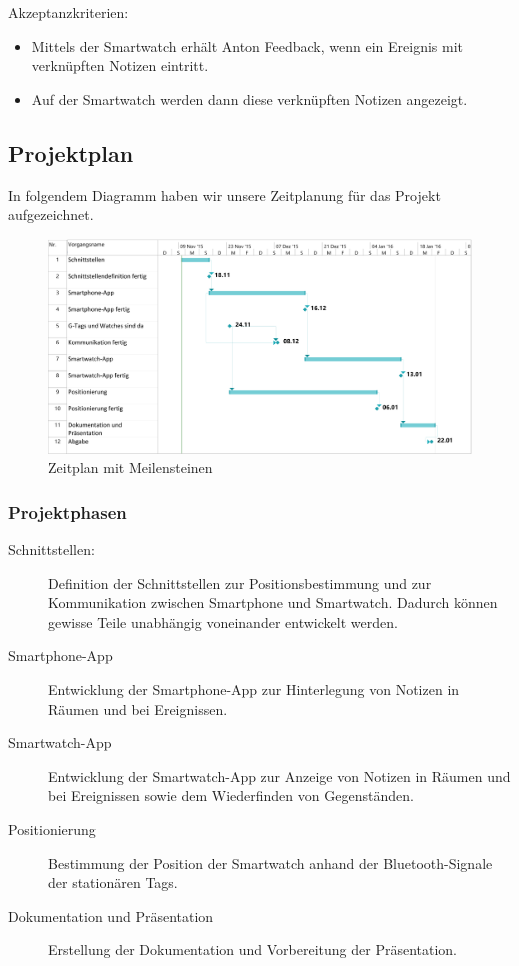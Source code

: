 Akzeptanzkriterien:
\begin{itemize}
\item Mittels der Smartwatch erhält Anton Feedback, wenn ein Ereignis mit verknüpften Notizen eintritt.
\item Auf der Smartwatch werden dann diese verknüpften Notizen angezeigt.
\end{itemize}


\subsection{Projektplan}

In folgendem Diagramm haben wir unsere Zeitplanung für das Projekt aufgezeichnet.

\begin{figure}[tbh]
\centering
\includegraphics[width=1.0\linewidth]{Bilder/Projektplan}
\caption{Zeitplan mit Meilensteinen}
\label{fig:Zeitplan-1}
\end{figure}

\subsubsection{Projektphasen}
\begin{description}
	\item[Schnittstellen:] Definition der Schnittstellen zur Positionsbestimmung und zur Kommunikation zwischen
	Smartphone und Smartwatch. Dadurch können gewisse Teile unabhängig voneinander entwickelt werden.
	\item[Smartphone-App] Entwicklung der Smartphone-App zur Hinterlegung von Notizen in Räumen und bei Ereignissen.
	\item[Smartwatch-App] Entwicklung der Smartwatch-App zur Anzeige von Notizen in Räumen und bei Ereignissen sowie
	dem Wiederfinden von Gegenständen.
	\item[Positionierung] Bestimmung der Position der Smartwatch anhand der Bluetooth-Signale der stationären Tags.
	\item[Dokumentation und Präsentation] Erstellung der Dokumentation und Vorbereitung der Präsentation.
\end{description}

